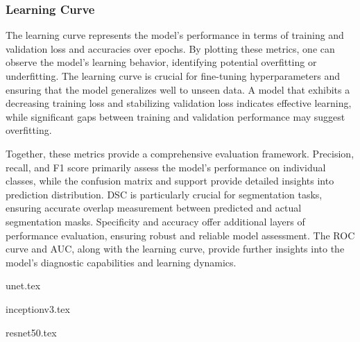 \subsubsection{Learning Curve}

The learning curve represents the model's performance in terms of training and validation loss and accuracies over epochs. By plotting these metrics, one can observe the model's learning behavior, identifying potential overfitting or underfitting. The learning curve is crucial for fine-tuning hyperparameters and ensuring that the model generalizes well to unseen data. A model that exhibits a decreasing training loss and stabilizing validation loss indicates effective learning, while significant gaps between training and validation performance may suggest overfitting.

Together, these metrics provide a comprehensive evaluation framework. Precision, recall, and F1 score primarily assess the model's performance on individual classes, while the confusion matrix and support provide detailed insights into prediction distribution. DSC is particularly crucial for segmentation tasks, ensuring accurate overlap measurement between predicted and actual segmentation masks. Specificity and accuracy offer additional layers of performance evaluation, ensuring robust and reliable model assessment. The ROC curve and AUC, along with the learning curve, provide further insights into the model's diagnostic capabilities and learning dynamics.




{unet.tex}

{inceptionv3.tex}

{resnet50.tex}
